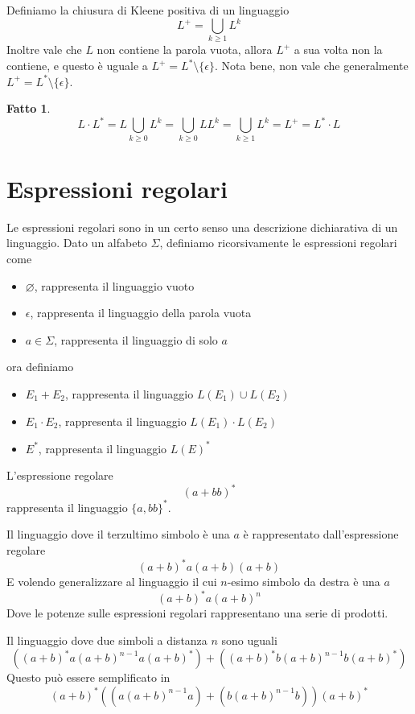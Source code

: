 \documentclass[12pt]{report}
\newtheorem{fatto}{Fatto}
\begin{document}
Definiamo la chiusura di Kleene positiva di un linguaggio
$$ L^+ = \bigcup_{k \geq 1} L^k $$
Inoltre vale che $L$ non contiene la parola vuota, allora $L^+$ a sua volta non la contiene, e questo è uguale a $L^+ = L^* \setminus \{\epsilon\}$.
Nota bene, non vale che generalmente $L^+ = L^* \setminus \{\epsilon\}$.
\begin{fatto}
	$$ L\cdot L^* = L \bigcup_{k \geq 0} L^k = \bigcup_{k \geq 0} L L^k = \bigcup_{k \geq 1} L^k = L^+ = L^* \cdot L $$
\end{fatto}

\section{Espressioni regolari}
Le espressioni regolari sono in un certo senso una descrizione dichiarativa di un linguaggio.
Dato un alfabeto $\Sigma$, definiamo ricorsivamente le espressioni regolari come
\begin{itemize}
	\item $\varnothing$, rappresenta il linguaggio vuoto
	\item $\epsilon$, rappresenta il linguaggio della parola vuota
	\item $a \in \Sigma$, rappresenta il linguaggio di solo $a$
\end{itemize}
ora definiamo
\begin{itemize}
	\item $E_1 + E_2$, rappresenta il linguaggio $L(E_1) \cup L(E_2)$
	\item $E_1 \cdot E_2$, rappresenta il linguaggio $L(E_1) \cdot L(E_2)$
	\item $E^*$, rappresenta il linguaggio $L(E)^*$
\end{itemize}
\begin{tcolorbox}
	L'espressione regolare
	$$ (a + bb)^*$$
	rappresenta il linguaggio $\{a, bb\}^*$.
\end{tcolorbox}
\begin{tcolorbox}
	Il linguaggio dove il terzultimo simbolo è una $a$ è rappresentato dall'espressione regolare
	$$ (a + b)^* a (a + b) (a + b) $$
	E volendo generalizzare al linguaggio il cui $n$-esimo simbolo da destra è una $a$
	$$ (a + b)^* a (a + b)^n $$
	Dove le potenze sulle espressioni regolari rappresentano una serie di prodotti.
\end{tcolorbox}
\begin{tcolorbox}
	Il linguaggio dove due simboli a distanza $n$ sono uguali
	$$ ((a + b)^* a (a + b)^{n - 1} a (a + b)^*) + ((a + b)^* b (a + b)^{n - 1} b (a + b)^*)$$
	Questo può essere semplificato in
	$$ (a + b)^* ((a (a + b)^{n - 1} a) + (b (a + b)^{n - 1} b)) (a + b)^* $$
\end{tcolorbox}
\end{document}
